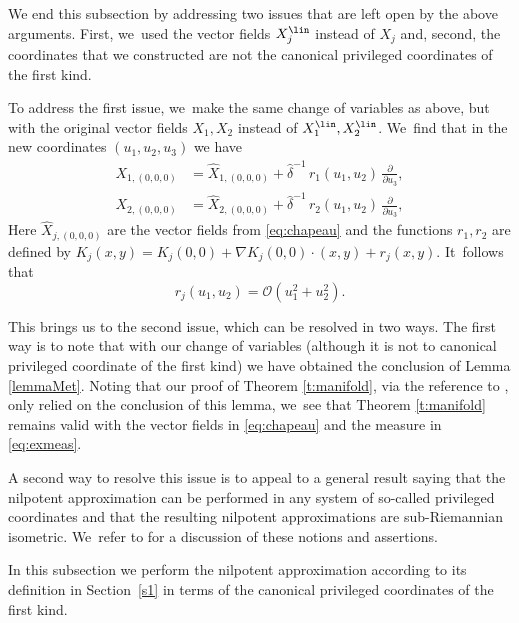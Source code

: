 We end this subsection by addressing two issues that are left open by the above arguments. First, we~used the vector fields $X_j^\lin$ instead of $X_j$ and, second, the coordinates that we constructed are not the canonical privileged coordinates of the first kind.

To address the first issue, we~make the same change of variables as above, but with the original vector fields $X_1,X_2$ instead of $X_1^\lin,X_2^\lin$. We~find that in the new coordinates $(u_1,u_2,u_3)$ we have
\begin{align*}
X_{1,(0,0,0)} & = \widehat X_{1,(0,0,0)} + \widehat\delta^{-1} \,r_1(u_1,u_2) \,\frac{\partial}{\partial u_3},\\
X_{2,(0,0,0)} & = \widehat X_{2,(0,0,0)} + \widehat\delta^{-1} \,r_2(u_1,u_2) \,\frac{\partial}{\partial u_3},
\end{align*}
Here $\widehat X_{j,(0,0,0)}$ are the vector fields from \eqref{eq:chapeau} and the functions $r_1,r_2$ are defined by $K_j(x,y)= K_j(0,0) + \nabla K_j(0,0) \cdot (x, y) + r_{j} (x,y)$. It~follows that
\[
r_{j}(u_1,u_2) = \mathcal O (u_1^2 + u_2^2).
\]

This brings us to the second issue, which can be resolved in two ways. The first way is to note that with our change of variables (although it is not to canonical privileged coordinate of the first kind) we have obtained the conclusion of Lemma \ref{lemmaMet}. Noting that our proof of Theorem \ref{t:manifold}, via the reference to \cite{Rot}, only relied on the conclusion of this lemma, we~see that Theorem \ref{t:manifold} remains valid with the vector fields in \eqref{eq:chapeau} and the measure in \eqref{eq:exmeas}.

A second way to resolve this issue is to appeal to a general result saying that the nilpotent approximation can be performed in any system of so-called privileged coordinates and that the resulting nilpotent approximations are sub-Riemannian isometric. We~refer to \cite[\S A.5.4]{CHT1} for a discussion of these notions and assertions.

In this subsection we perform the nilpotent approximation according to its definition in Section~\ref{s1} in terms of the canonical privileged coordinates of the first kind.


